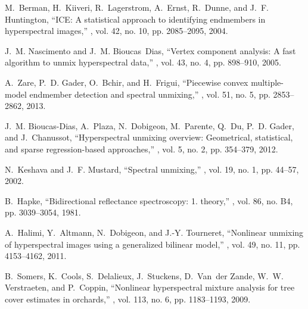 \documentclass[twocolumn,english]{IEEEtran}
\theoremstyle{plain}
\begin{document}

\begin{thebibliography}{10}

M.~Berman, H.~Kiiveri, R.~Lagerstrom, A.~Ernst, R.~Dunne, and J.~F. Huntington,
\newblock ``{ICE}: A statistical approach to identifying endmembers in
  hyperspectral images,''
, vol. 42, no. 10,
  pp. 2085--2095, 2004.

J.~M. Nascimento and J.~M. Bioucas~Dias,
\newblock ``Vertex component analysis: A fast algorithm to unmix hyperspectral
  data,''
, vol. 43, no. 4,
  pp. 898--910, 2005.

A.~Zare, P.~D. Gader, O.~Bchir, and H.~Frigui,
\newblock ``Piecewise convex multiple-model endmember detection and spectral
  unmixing,''
, vol. 51, no. 5,
  pp. 2853--2862, 2013.

J.~M. Bioucas-Dias, A.~Plaza, N.~Dobigeon, M.~Parente, Q.~Du, P.~D. Gader, and
  J.~Chanussot,
\newblock ``Hyperspectral unmixing overview: Geometrical, statistical, and
  sparse regression-based approaches,''
, vol. 5, no. 2, pp. 354--379, 2012.

N.~Keshava and J.~F. Mustard,
\newblock ``Spectral unmixing,''
, vol. 19, no. 1, pp. 44--57,
  2002.

B.~Hapke,
\newblock ``Bidirectional reflectance spectroscopy: 1. theory,''
, vol.
  86, no. B4, pp. 3039--3054, 1981.

A.~Halimi, Y.~Altmann, N.~Dobigeon, and J.-Y. Tourneret,
\newblock ``Nonlinear unmixing of hyperspectral images using a generalized
  bilinear model,''
, vol. 49, no. 11,
  pp. 4153--4162, 2011.

B.~Somers, K.~Cools, S.~Delalieux, J.~Stuckens, D.~Van~der Zande, W.~W.
  Verstraeten, and P.~Coppin,
\newblock ``Nonlinear hyperspectral mixture analysis for tree cover estimates
  in orchards,''
, vol. 113, no. 6, pp. 1183--1193,
  2009.


\end{thebibliography}
\end{document}
